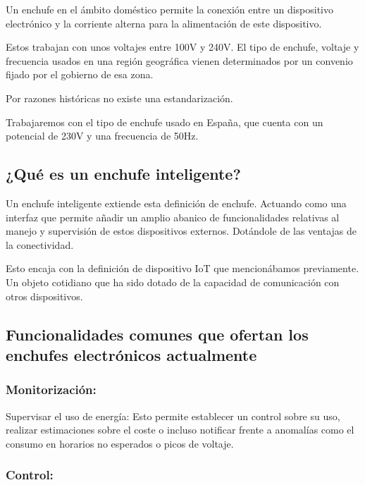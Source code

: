 \documentclass[a4paper,10pt]{article}
\begin{document}
Un enchufe en el ámbito doméstico permite la conexión entre un
dispositivo electrónico y la corriente alterna para la alimentación de
este dispositivo.

Estos trabajan con unos voltajes entre 100V y
240V.\cite{iecIECWorldPlugs} El tipo de enchufe, voltaje y frecuencia
usados en una región geográfica vienen determinados por un convenio
fijado por el gobierno de esa zona.

Por razones históricas\cite{nuevatribunaOrigenFrecuenciasElectricas}
no existe una estandarización.

Trabajaremos con el tipo de enchufe usado en España, que cuenta con un
potencial de 230V y una frecuencia de 50Hz\cite{IECWorldPlugs}.


\subsection{¿Qué es un enchufe
inteligente?}\label{quuxe9-es-un-enchufe-inteligente}

Un enchufe inteligente extiende esta definición de enchufe. Actuando
como una interfaz que permite añadir un amplio abanico de
funcionalidades relativas al manejo y supervisión de estos dispositivos
externos. Dotándole de las ventajas de la conectividad.

Esto encaja con la definición de dispositivo IoT que mencionábamos
previamente. Un objeto cotidiano que ha sido dotado de la capacidad de
comunicación con otros dispositivos.

\subsection{Funcionalidades comunes que ofertan los enchufes
electrónicos
actualmente}\label{funcionalidades-comunes-que-ofertan-los-enchufes-electruxf3nicos-actualmente}

\subsubsection{Monitorización:}\label{monitorizaciuxf3n}

Supervisar el uso de energía: Esto permite establecer un control sobre
su uso, realizar estimaciones sobre el coste o incluso notificar frente
a anomalías como el consumo en horarios no esperados o picos de voltaje.

\subsubsection{Control:}\label{control}
\end{document}

